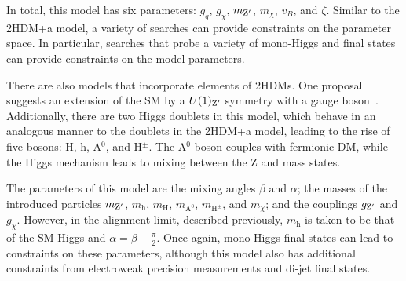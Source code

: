 In total, this model has six parameters: $g_q$, $g_\chi$, $m_{\mathrm{Z}'}$, $m_\chi$, $v_B$, and $\zeta$. Similar to the 2HDM+a model, a variety of searches can provide constraints on the parameter space. In particular, searches that probe a variety of mono-Higgs and \ptmiss final states can provide constraints on the model parameters.

There are also \Zp models that incorporate elements of 2HDMs. One proposal suggests an extension of the SM by a $U(1)_{\mathrm{Z}'}$ symmetry with a \Zp gauge boson~\cite{Z2hdm2014}. Additionally, there are two Higgs doublets in this model, which behave in an analogous manner to the doublets in the 2HDM+a model, leading to the rise of five bosons: H, h, A$^0$, and H$^\pm$. The A$^0$ boson couples with fermionic DM, while the Higgs mechanism leads to mixing between the Z and \Zp mass states. 

The parameters of this model are the mixing angles $\beta$ and $\alpha$; the masses of the introduced particles $m_{\mathrm{Z}'}$, $m_\mathrm{h}$, $m_\mathrm{H}$, $m_{\mathrm{A}^0}$, $m_{\mathrm{H}^\pm}$, and $m_\chi$; and the couplings $g_{\mathrm{Z}'}$ and $g_\chi$. However, in the alignment limit, described previously, $m_\mathrm{h}$ is taken to be that of the SM Higgs and $\alpha = \beta-\frac{\pi}{2}$. Once again, mono-Higgs final states can lead to constraints on these parameters, although this model also has additional constraints from electroweak precision measurements and di-jet final states.
